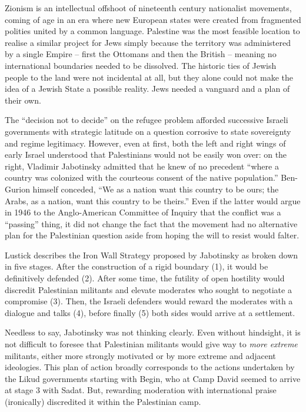\documentclass[letterpaper,12pt,twoside]{article} %
\begin{document}
\begin{multicols}{2}
Zionism is an intellectual offshoot of nineteenth century nationalist movements, coming of age in an era where new European states were created from fragmented polities united by a common language. Palestine was the most feasible location to realise a similar project for Jews simply because the territory was administered by a single Empire -- first the Ottomans and then the British -- meaning no international boundaries needed to be dissolved. The historic ties of Jewish people to the land were not incidental at all, but they alone could not make the idea of a Jewish State a possible reality. Jews needed a vanguard and a plan of their own.

The ``decision not to decide'' on the refugee problem afforded successive Israeli governments with strategic latitude on a question corrosive to state sovereignty and regime legitimacy. However, even at first, both the left and right wings of early Israel understood that Palestinians would not be easily won over: on the right, Vladimir Jabotinsky admitted that he knew of no precedent ``where a country was colonized with the courteous consent of the native population.''\autocite[113]{caplan1978question} Ben-Gurion himself conceded, ``We as a nation want this country to be ours; the Arabs, as a nation, want this country to be theirs.''\autocite[80]{smith1988palestine} Even if the latter would argue in 1946 to the Anglo-American Committee of Inquiry that the conflict was a ``passing'' thing, it did not change the fact that the movement had no alternative plan for the Palestinian question aside from hoping the will to resist would falter. 

Lustick describes the Iron Wall Strategy proposed by Jabotinsky as broken down in five stages. After the construction of a rigid boundary (1), it would be definitively defended (2). After some time, the futility of open hostility would discredit Palestinian militants and elevate moderates who sought to negotiate a compromise (3). Then, the Israeli defenders would reward the moderates with a dialogue and talks (4), before finally (5) both sides would arrive at a settlement.\autocite{lustick2019paradigm} 

Needless to say, Jabotinsky was not thinking clearly. Even without hindsight, it is not difficult to foresee that Palestinian militants would give way to \textit{more extreme} militants, either more strongly motivated or by more extreme and adjacent ideologies. This plan of action broadly corresponds to the actions undertaken by the Likud governments starting with Begin, who at Camp David seemed to arrive at stage 3 with Sadat. But, rewarding moderation with international praise (ironically) discredited it within the Palestinian camp.


\end{multicols}
\end{document}
